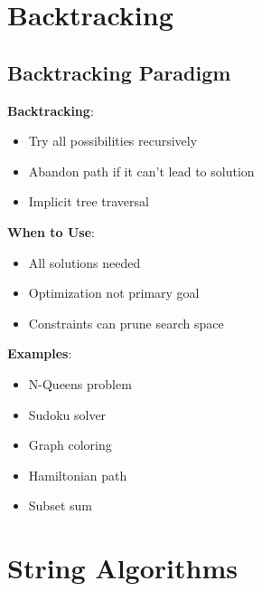 \documentclass[12pt,a4paper]{report}
\begin{document}
\section{Backtracking}

\subsection{Backtracking Paradigm}
\begin{concept}
\textbf{Backtracking}:
\begin{itemize}
    \item Try all possibilities recursively
    \item Abandon path if it can't lead to solution
    \item Implicit tree traversal
\end{itemize}

\textbf{When to Use}:
\begin{itemize}
    \item All solutions needed
    \item Optimization not primary goal
    \item Constraints can prune search space
\end{itemize}

\textbf{Examples}:
\begin{itemize}
    \item N-Queens problem
    \item Sudoku solver
    \item Graph coloring
    \item Hamiltonian path
    \item Subset sum
\end{itemize}
\end{concept}

\section{String Algorithms}
\end{document}
